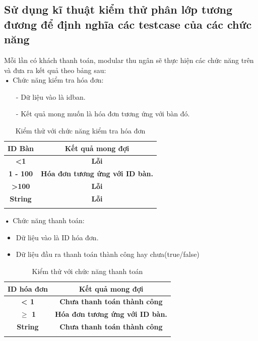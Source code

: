 \documentclass[a4paper,12pt]{report}
\begin{document}
\subsection{Sử dụng kĩ thuật kiểm thử phân lớp tương đương để định nghĩa các testcase của các chức năng}
Mỗi lần có khách thanh toán, modular thu ngân sẽ thực hiện các chức năng trên và đưa ra kết quả theo bảng sau:\\
\textbf{•} Chức năng kiểm tra hóa đơn:
\begin{itemize}
\item[-] Dữ liệu vào là idban.
\item[-] Kết quả mong muốn là hóa đơn tương ứng với bàn đó.
\end{itemize}
\begin{longtable}{|c|c|}
\hline
\textbf{ID Bàn}   			& \textbf{Kết quả mong đợi} \\
\hline
\textbf{<1} &\textbf{ Lỗi} \\
\hline
\textbf{1 - 100} & \textbf{Hóa đơn tương ứng với ID bàn.} \\
\hline
\textbf{>100} & \textbf{Lỗi}\\
\hline
\textbf{String} & \textbf{Lỗi}\\
\hline
\caption{Kiểm thử với chức năng kiểm tra hóa đơn}
\end{longtable}
\textbf{•} Chức năng thanh toán:
\begin{itemize}
\item Dữ liệu vào là ID hóa đơn.
\item Dữ liệu đầu ra thanh toán thành công hay chưa(true/false)
\end{itemize}
\begin{longtable}{|c|c|}
\hline
\textbf{ID hóa đơn}   			& \textbf{Kết quả mong đợi} \\
\hline
\textbf{< 1} &\textbf{ Chưa thanh toán thành công} \\
\hline
\textbf{$\geq$ 1} & \textbf{Hóa đơn tương ứng với ID bàn.} \\
\hline
\textbf{String} & \textbf{ Chưa thanh toán thành công}\\
\hline
\caption{Kiểm thử với chức năng thanh toán}
\end{longtable}
\end{document}
